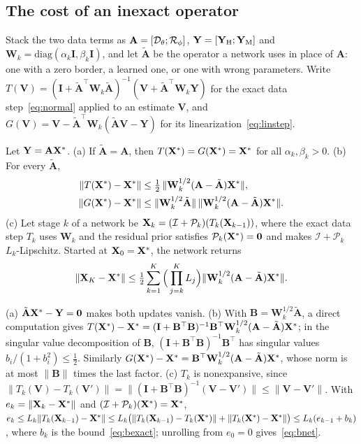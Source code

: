 \documentclass[journal]{IEEEtran}
\begin{document}
\subsection{The cost of an inexact operator}
\label{sec:mismatch}
Stack the two data terms as $\mathbf{A}=[\mathcal{D}_\theta;\mathcal{R}_\phi]$, $\mathbf{Y}=[\mathbf{Y}_{\mathrm{H}};\mathbf{Y}_{\mathrm{M}}]$ and $\mathbf{W}_k=\mathrm{diag}(\alpha_k\mathbf{I},\beta_k\mathbf{I})$, and let $\tilde{\mathbf{A}}$ be the operator a network uses in place of $\mathbf{A}$: one with a zero border, a learned one, or one with wrong parameters. Write $T(\mathbf{V})=(\mathbf{I}+\tilde{\mathbf{A}}^{\top}\mathbf{W}_k\tilde{\mathbf{A}})^{-1}(\mathbf{V}+\tilde{\mathbf{A}}^{\top}\mathbf{W}_k\mathbf{Y})$ for the exact data step~\eqref{eq:normal} applied to an estimate $\mathbf{V}$, and $G(\mathbf{V})=\mathbf{V}-\tilde{\mathbf{A}}^{\top}\mathbf{W}_k(\tilde{\mathbf{A}}\mathbf{V}-\mathbf{Y})$ for its linearization~\eqref{eq:linstep}.
\begin{theorem}
\label{thm:mismatch}
Let $\mathbf{Y}=\mathbf{A}\mathbf{X}^*$. (a) If $\tilde{\mathbf{A}}=\mathbf{A}$, then $T(\mathbf{X}^*)=G(\mathbf{X}^*)=\mathbf{X}^*$ for all $\alpha_k,\beta_k>0$. (b) For every $\tilde{\mathbf{A}}$,
\begin{align}
\|T(\mathbf{X}^*)-\mathbf{X}^*\|&\le\tfrac12\,\|\mathbf{W}_k^{1/2}(\mathbf{A}-\tilde{\mathbf{A}})\mathbf{X}^*\|,\label{eq:bexact}\\
\|G(\mathbf{X}^*)-\mathbf{X}^*\|&\le\|\mathbf{W}_k^{1/2}\tilde{\mathbf{A}}\|\,\|\mathbf{W}_k^{1/2}(\mathbf{A}-\tilde{\mathbf{A}})\mathbf{X}^*\|.\label{eq:bgrad}
\end{align}
(c) Let stage $k$ of a network be $\mathbf{X}_k=(\mathcal{I}+\mathcal{P}_k)(T_k(\mathbf{X}_{k-1}))$, where the exact data step $T_k$ uses $\mathbf{W}_k$ and the residual prior satisfies $\mathcal{P}_k(\mathbf{X}^*)=\mathbf{0}$ and makes $\mathcal{I}+\mathcal{P}_k$ $L_k$-Lipschitz. Started at $\mathbf{X}_0=\mathbf{X}^*$, the network returns
\begin{equation}
\|\mathbf{X}_K-\mathbf{X}^*\|\le\tfrac12\sum_{k=1}^{K}\Big(\prod_{j=k}^{K}L_j\Big)\|\mathbf{W}_k^{1/2}(\mathbf{A}-\tilde{\mathbf{A}})\mathbf{X}^*\|.
\label{eq:bnet}
\end{equation}
\end{theorem}
\begin{IEEEproof}
(a) $\tilde{\mathbf{A}}\mathbf{X}^*-\mathbf{Y}=\mathbf{0}$ makes both updates vanish. (b) With $\mathbf{B}=\mathbf{W}_k^{1/2}\tilde{\mathbf{A}}$, a direct computation gives $T(\mathbf{X}^*)-\mathbf{X}^*=(\mathbf{I}+\mathbf{B}^{\top}\mathbf{B})^{-1}\mathbf{B}^{\top}\mathbf{W}_k^{1/2}(\mathbf{A}-\tilde{\mathbf{A}})\mathbf{X}^*$; in the singular value decomposition of $\mathbf{B}$, $(\mathbf{I}+\mathbf{B}^{\top}\mathbf{B})^{-1}\mathbf{B}^{\top}$ has singular values $b_i/(1+b_i^2)\le\tfrac12$. Similarly $G(\mathbf{X}^*)-\mathbf{X}^*=\mathbf{B}^{\top}\mathbf{W}_k^{1/2}(\mathbf{A}-\tilde{\mathbf{A}})\mathbf{X}^*$, whose norm is at most $\|\mathbf{B}\|$ times the last factor. (c) $T_k$ is nonexpansive, since $\|T_k(\mathbf{V})-T_k(\mathbf{V}')\|=\|(\mathbf{I}+\mathbf{B}^{\top}\mathbf{B})^{-1}(\mathbf{V}-\mathbf{V}')\|\le\|\mathbf{V}-\mathbf{V}'\|$. With $e_k=\|\mathbf{X}_k-\mathbf{X}^*\|$ and $(\mathcal{I}+\mathcal{P}_k)(\mathbf{X}^*)=\mathbf{X}^*$, $e_k\le L_k\|T_k(\mathbf{X}_{k-1})-\mathbf{X}^*\|\le L_k\big(\|T_k(\mathbf{X}_{k-1})-T_k(\mathbf{X}^*)\|+\|T_k(\mathbf{X}^*)-\mathbf{X}^*\|\big)\le L_k(e_{k-1}+b_k)$, where $b_k$ is the bound~\eqref{eq:bexact}; unrolling from $e_0=0$ gives~\eqref{eq:bnet}.
\end{IEEEproof}
\end{document}

